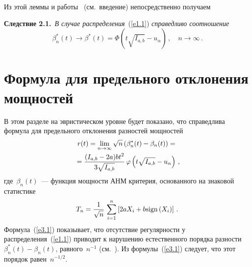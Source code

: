 \begin{multicols}{2}
Из  этой леммы и работы~\cite{6be} (см.\ введение) непосредственно получаем


\smallskip

\noindent
\textbf{Следствие 2.1.}\ {\it В случае распределения}~(\ref{e1.1}) {\it справедливо соотношение
$$
\beta_n^*(t)\to\beta^*(t)=
\Phi\left(t\sqrt{I_{a,b}}-u_\alpha\right)\,, \quad n \to\infty\,.
$$
}


\section{Формула для предельного отклонения мощностей}

В этом разделе на эвристическом уровне будет показано, что
справедлива формула для предельного отклонения разностей мощностей
\begin{multline}
r(t)=\lim_{n \to \infty}{\sqrt n\left(\beta_n^*(t)-\beta_n(t)\right)}={}\\
{}=
\displaystyle\frac{\displaystyle (I_{a,b}-2a)bt^2\mathstrut}{\displaystyle 3\sqrt{I_{a,b}}\mathstrut}\,
\varphi\left(t\sqrt{I_{a,b}}-u_{\alpha}\right)\,,
\label{e3.1}
\end{multline}
где~$\beta_n(t)$~--- функция мощности АНМ критерия, основанного на
знаковой статистике
\begin{equation}
T_{n} =\displaystyle\frac{\displaystyle 1\mathstrut}{\displaystyle \sqrt{n}\mathstrut}\,\sum_{i=1}^{n}\left[2aX_{i}+b
\mathrm{sign}\left(X_{i} \right)\right]\,. \label{e3.2}
\end{equation}
Формула~(\ref{e3.1}) показывает, что отсутствие регулярности у
распределения~(\ref{e1.1}) приводит к нарушению естественного порядка
разности $\beta_n^*(t)-\beta_n(t)$,
равного~$n^{-1}$ (см.~\cite{1be}). Из формулы~(\ref{e3.1})  следует, что этот порядок равен~$n^{-1/2}$.


\end{multicols}
